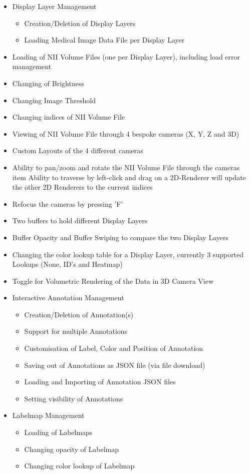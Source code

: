 \documentclass[a4paper,11pt,titlepage]{article}
\begin{document}
\begin{itemize}
\item Display Layer Management

  \begin{itemize}
  \item Creation/Deletion of Display Layers
  \item Loading Medical Image Data File per Display Layer
  \end{itemize}

\item Loading of NII Volume Files (one per Display Layer), including load error management	
\item Changing of Brightness
\item Changing Image Threshold
\item Changing indices of NII Volume File
\item Viewing of NII Volume File through 4 bespoke cameras (X, Y, Z and 3D)
\item Custom Layouts of the 4 different cameras
\item Ability to pan/zoom and rotate the NII Volume File through the cameras
  item Ability to traverse by left-click and drag on a 2D-Renderer will update the other 2D Renderers to the current indices
\item Refocus the cameras by pressing 'F'
\item Two buffers to hold different Display Layers
\item Buffer Opacity and Buffer Swiping to compare the two Display Layers
\item Changing the color lookup table for a Display Layer, currently 3 supported Lookups (None, ID's and Heatmap)
\item Toggle for Volumetric Rendering of the Data in 3D Camera View
\item Interactive Annotation Management

  \begin{itemize}
  \item Creation/Deletion of Annotation(s)
  \item Support for multiple Annotations
  \item Customisation of Label, Color and Position of Annotation
  \item Saving out of Annotations as JSON file (via file download)
  \item Loading and Importing of Annotation JSON files
  \item Setting visibility of Annotations
  \end{itemize}

\item Labelmap Management

  \begin{itemize}
  \item Loading of Labelmaps
  \item Changing opacity of Labelmap
  \item Changing color lookup of Labelmap
  \end{itemize}

\end{itemize}
\end{document}
